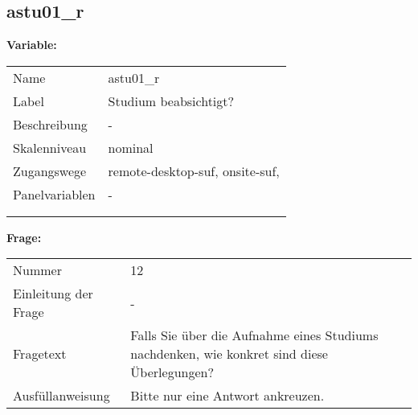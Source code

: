 	
	
	\subsection{astu01\_r}
	\label{subSection:astu01_r}

	\noindent\textbf{Variable:}\\
		\begin{tabular}{lL{11.3cm}}
			\label{tableVariable:astu01_r}
			Name & astu01\_r \\
			Label & Studium beabsichtigt? \\
			Beschreibung & - \\
			Skalenniveau & nominal \\
			Zugangswege &
				remote-desktop-suf,
				onsite-suf,
 \\
			Panelvariablen & -
			 \\
			 \\
 \\
		\end{tabular}

		\vspace*{1 cm}
		\noindent\textbf{Frage:}\\
		\begin{tabular}{lL{11.3cm}}
			\label{tableQuestion:astu01_r}
			Nummer & 12 \\
			Einleitung der Frage & - \\
			Fragetext & Falls Sie über die Aufnahme eines Studiums nachdenken, wie konkret sind diese Überlegungen? \\
			Ausfüllanweisung & Bitte nur eine Antwort ankreuzen. \\
		\end{tabular}





